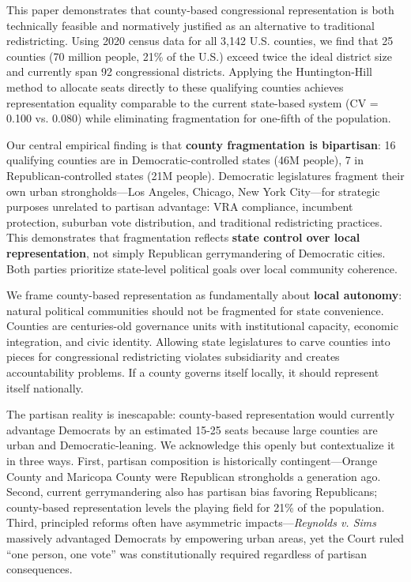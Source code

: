 This paper demonstrates that county-based congressional representation is both technically feasible and normatively justified as an alternative to traditional redistricting. Using 2020 census data for all 3,142 U.S. counties, we find that 25 counties (70 million people, 21\% of the U.S.) exceed twice the ideal district size and currently span 92 congressional districts. Applying the Huntington-Hill method to allocate seats directly to these qualifying counties achieves representation equality comparable to the current state-based system (CV = 0.100 vs. 0.080) while eliminating fragmentation for one-fifth of the population.

Our central empirical finding is that \textbf{county fragmentation is bipartisan}: 16 qualifying counties are in Democratic-controlled states (46M people), 7 in Republican-controlled states (21M people). Democratic legislatures fragment their own urban strongholds---Los Angeles, Chicago, New York City---for strategic purposes unrelated to partisan advantage: VRA compliance, incumbent protection, suburban vote distribution, and traditional redistricting practices. This demonstrates that fragmentation reflects \textbf{state control over local representation}, not simply Republican gerrymandering of Democratic cities. Both parties prioritize state-level political goals over local community coherence.

We frame county-based representation as fundamentally about \textbf{local autonomy}: natural political communities should not be fragmented for state convenience. Counties are centuries-old governance units with institutional capacity, economic integration, and civic identity. Allowing state legislatures to carve counties into pieces for congressional redistricting violates subsidiarity and creates accountability problems. If a county governs itself locally, it should represent itself nationally.

The partisan reality is inescapable: county-based representation would currently advantage Democrats by an estimated 15-25 seats because large counties are urban and Democratic-leaning. We acknowledge this openly but contextualize it in three ways. First, partisan composition is historically contingent---Orange County and Maricopa County were Republican strongholds a generation ago. Second, current gerrymandering also has partisan bias favoring Republicans; county-based representation levels the playing field for 21\% of the population. Third, principled reforms often have asymmetric impacts---\emph{Reynolds v. Sims} massively advantaged Democrats by empowering urban areas, yet the Court ruled ``one person, one vote'' was constitutionally required regardless of partisan consequences.

